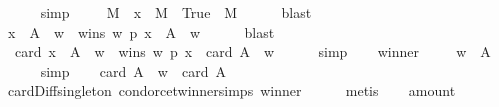\begin{isabellebody}
\ \ \ \ \isamarkupfalse%
\ simp\isanewline
\ \ \isamarkupfalse%
\ {}{\isacharcolon}{\kern0pt}\ {\isachardoublequoteopen}{\isasymforall}M\ {\isachardot}{\kern0pt}\ {\isacharbraceleft}{\kern0pt}x\ {\isasymin}\ M\ {\isachardot}{\kern0pt}\ True{\isacharbraceright}{\kern0pt}\ {\isacharequal}{\kern0pt}\ M{\isachardoublequoteclose}\isanewline
\ \ \ \ \isamarkupfalse%
\ blast\isanewline
\ \ \isamarkupfalse%
\ {}\ {}\isanewline
\ \ \isamarkupfalse%
\ {\isachardoublequoteopen}{\isacharbraceleft}{\kern0pt}x\ {\isasymin}\ A\ {\isacharminus}{\kern0pt}\ {\isacharbraceleft}{\kern0pt}w{\isacharbraceright}{\kern0pt}\ {\isachardot}{\kern0pt}\ wins\ w\ p\ x{\isacharbraceright}{\kern0pt}\ {\isacharequal}{\kern0pt}\ A\ {\isacharminus}{\kern0pt}\ {\isacharbraceleft}{\kern0pt}w{\isacharbraceright}{\kern0pt}{\isachardoublequoteclose}\isanewline
\ \ \ \ \isamarkupfalse%
\ blast\isanewline
\ \ \isamarkupfalse%
\ {}{}{\isacharcolon}{\kern0pt}\ {\isachardoublequoteopen}card\ {\isacharbraceleft}{\kern0pt}x\ {\isasymin}\ A\ {\isacharminus}{\kern0pt}\ {\isacharbraceleft}{\kern0pt}w{\isacharbraceright}{\kern0pt}\ {\isachardot}{\kern0pt}\ wins\ w\ p\ x{\isacharbraceright}{\kern0pt}\ {\isacharequal}{\kern0pt}\ card\ {\isacharparenleft}{\kern0pt}A\ {\isacharminus}{\kern0pt}\ {\isacharbraceleft}{\kern0pt}w{\isacharbraceright}{\kern0pt}{\isacharparenright}{\kern0pt}{\isachardoublequoteclose}\isanewline
\ \ \ \ \isamarkupfalse%
\ simp\isanewline
\ \ \isamarkupfalse%
\ winner\isanewline
\ \ \isamarkupfalse%
\ {}{}{\isacharcolon}{\kern0pt}\ {\isachardoublequoteopen}w\ {\isasymin}\ A{\isachardoublequoteclose}\isanewline
\ \ \ \ \isamarkupfalse%
\ simp\isanewline
\ \ \isamarkupfalse%
\ {\isachardoublequoteopen}card\ {\isacharparenleft}{\kern0pt}A\ {\isacharminus}{\kern0pt}\ {\isacharbraceleft}{\kern0pt}w{\isacharbraceright}{\kern0pt}{\isacharparenright}{\kern0pt}\ {\isacharequal}{\kern0pt}\ card\ A\ {\isacharminus}{\kern0pt}\ {}{\isachardoublequoteclose}\isanewline
\ \ \ \ \isamarkupfalse%
\ card{\isacharunderscore}{\kern0pt}Diff{\isacharunderscore}{\kern0pt}singleton\ condorcet{\isacharunderscore}{\kern0pt}winner{\isachardot}{\kern0pt}simps\ winner\isanewline
\ \ \ \ \isamarkupfalse%
\ metis\isanewline
\ \ \isamarkupfalse%
\ amount{}{\isacharcolon}{\kern0pt}\isanewline

\end{isabellebody}
